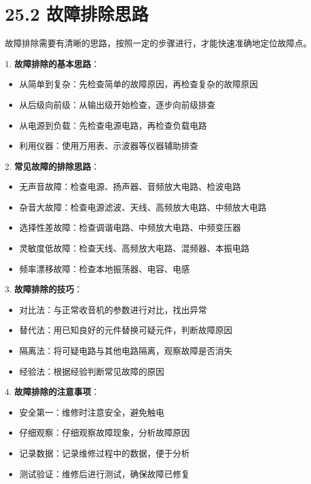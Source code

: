 \documentclass[12pt,UTF8]{ctexbook}
\begin{document}
\section*{25.2 故障排除思路}

故障排除需要有清晰的思路，按照一定的步骤进行，才能快速准确地定位故障点。

1. \textbf{故障排除的基本思路}：
   \begin{itemize}[leftmargin=3.5em]
   \item 从简单到复杂：先检查简单的故障原因，再检查复杂的故障原因
   \item 从后级向前级：从输出级开始检查，逐步向前级排查
   \item 从电源到负载：先检查电源电路，再检查负载电路
   \item 利用仪器：使用万用表、示波器等仪器辅助排查
   \end{itemize}

2. \textbf{常见故障的排除思路}：
   \begin{itemize}[leftmargin=3.5em]
   \item 无声音故障：检查电源、扬声器、音频放大电路、检波电路
   \item 杂音大故障：检查电源滤波、天线、高频放大电路、中频放大电路
   \item 选择性差故障：检查调谐电路、中频放大电路、中频变压器
   \item 灵敏度低故障：检查天线、高频放大电路、混频器、本振电路
   \item 频率漂移故障：检查本地振荡器、电容、电感
   \end{itemize}

3. \textbf{故障排除的技巧}：
   \begin{itemize}[leftmargin=3.5em]
   \item 对比法：与正常收音机的参数进行对比，找出异常
   \item 替代法：用已知良好的元件替换可疑元件，判断故障原因
   \item 隔离法：将可疑电路与其他电路隔离，观察故障是否消失
   \item 经验法：根据经验判断常见故障的原因
   \end{itemize}

4. \textbf{故障排除的注意事项}：
   \begin{itemize}[leftmargin=3.5em]
   \item 安全第一：维修时注意安全，避免触电
   \item 仔细观察：仔细观察故障现象，分析故障原因
   \item 记录数据：记录维修过程中的数据，便于分析
   \item 测试验证：维修后进行测试，确保故障已修复
   \end{itemize}
\end{document}

